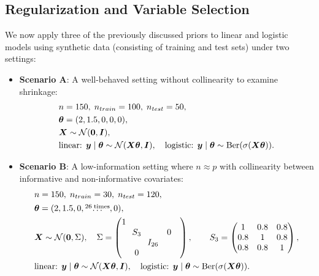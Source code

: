 \subsection{Regularization and Variable Selection}

We now apply three of the previously discussed priors to linear and logistic models using synthetic data (consisting of training and test sets) under two settings:

\begin{itemize}
    \item \textbf{Scenario A}: A well-behaved setting without collinearity to examine shrinkage:
    \begin{equation*}
        \begin{aligned}
            &n = 150,\; n_{train} = 100,\;n_{test} = 50, \\
            &\bm{\theta} = (2, 1.5, 0, 0, 0), \\
            &\bm{X} \sim \mathcal{N}(\bm{0}, \bm{I}), \\
            &\text{linear: } \bm{y} \mid \bm{\theta} \sim \mathcal{N}(\bm{X} \bm{\theta},\bm{I}), \quad \text{logistic: } \bm{y} \mid \bm{\theta} \sim \text{Ber}(\sigma(\bm{X} \bm{\theta})).
        \end{aligned}
    \end{equation*}
    \item \textbf{Scenario B}: A low-information setting where $n \approx p$ with collinearity between informative and non-informative covariates:
    \begin{equation*}
        \begin{aligned}
            &n = 150,\; n_{train} = 30,\;n_{test} = 120, \\
            &\bm{\theta} = (2, 1.5, 0, \overset{26\; \text{times}}{\dots}, 0), \\
            &\bm{X} \sim \mathcal{N}(\bm{0}, \Sigma), \quad \Sigma =
                    \begin{pmatrix}
                    1 &        &         &        &        \\
                        & \!\!S_3\!\! &        & 0      &        \\
                        &        & I_{26} &        &        \\
                        & 0      &        &        &        \\
                    \end{pmatrix},
                    \qquad
                    S_3 = 
                    \begin{pmatrix}
                    1   & 0.8 & 0.8\\
                    0.8 & 1   & 0.8\\
                    0.8 & 0.8 & 1
                    \end{pmatrix},\\
            &\text{linear: } \bm{y} \mid \bm{\theta} \sim \mathcal{N}(\bm{X} \bm{\theta}, \bm{I}), \quad \text{logistic: } \bm{y} \mid \bm{\theta} \sim \text{Ber}(\sigma(\bm{X} \bm{\theta})).
        \end{aligned}
    \end{equation*}
\end{itemize}

